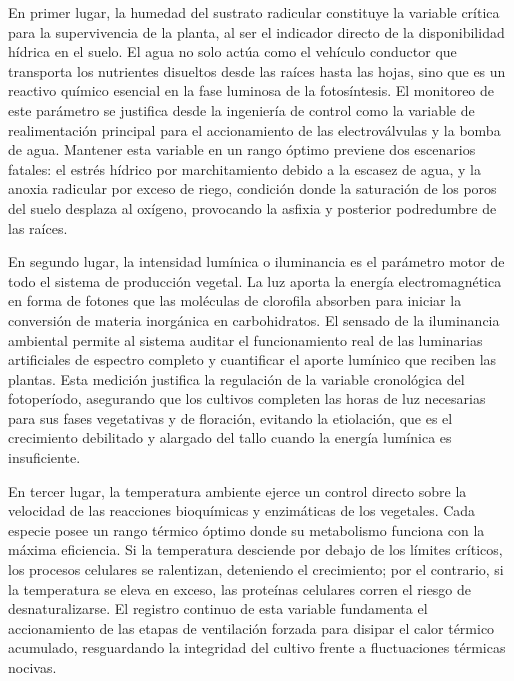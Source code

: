En primer lugar, la humedad del sustrato radicular constituye la variable crítica para la supervivencia de la planta, al ser el indicador directo de la disponibilidad hídrica en el suelo. El agua no solo actúa como el vehículo conductor que transporta los nutrientes disueltos desde las raíces hasta las hojas, sino que es un reactivo químico esencial en la fase luminosa de la fotosíntesis. El monitoreo de este parámetro se justifica desde la ingeniería de control como la variable de realimentación principal para el accionamiento de las electroválvulas y la bomba de agua. Mantener esta variable en un rango óptimo previene dos escenarios fatales: el estrés hídrico por marchitamiento debido a la escasez de agua, y la anoxia radicular por exceso de riego, condición donde la saturación de los poros del suelo desplaza al oxígeno, provocando la asfixia y posterior podredumbre de las raíces.

En segundo lugar, la intensidad lumínica o iluminancia es el parámetro motor de todo el sistema de producción vegetal. La luz aporta la energía electromagnética en forma de fotones que las moléculas de clorofila absorben para iniciar la conversión de materia inorgánica en carbohidratos. El sensado de la iluminancia ambiental permite al sistema auditar el funcionamiento real de las luminarias artificiales de espectro completo y cuantificar el aporte lumínico que reciben las plantas. Esta medición justifica la regulación de la variable cronológica del fotoperíodo, asegurando que los cultivos completen las horas de luz necesarias para sus fases vegetativas y de floración, evitando la etiolación, que es el crecimiento debilitado y alargado del tallo cuando la energía lumínica es insuficiente.

En tercer lugar, la temperatura ambiente ejerce un control directo sobre la velocidad de las reacciones bioquímicas y enzimáticas de los vegetales. Cada especie posee un rango térmico óptimo donde su metabolismo funciona con la máxima eficiencia. Si la temperatura desciende por debajo de los límites críticos, los procesos celulares se ralentizan, deteniendo el crecimiento; por el contrario, si la temperatura se eleva en exceso, las proteínas celulares corren el riesgo de desnaturalizarse. El registro continuo de esta variable fundamenta el accionamiento de las etapas de ventilación forzada para disipar el calor térmico acumulado, resguardando la integridad del cultivo frente a fluctuaciones térmicas nocivas.

